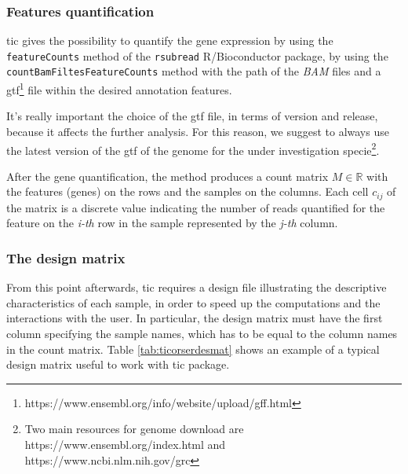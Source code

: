 \subsubsection{Features quantification}
\Gls{tic} gives the possibility to quantify the gene expression by using the \lstinline!featureCounts! method of the \lstinline!rsubread! R/Bioconductor package, by using the \lstinline!countBamFiltesFeatureCounts! method with the path of the \textit{BAM} files and a \gls{gtf}\footnote{https://www.ensembl.org/info/website/upload/gff.html} file within the desired annotation features.

It's really important the choice of the \gls{gtf} file, in terms of version and release, because it affects the further analysis. For this reason, we suggest to always use the latest version of the \gls{gtf} of the genome for the under investigation specie\footnote{Two main resources for genome download are https://www.ensembl.org/index.html and https://www.ncbi.nlm.nih.gov/grc}. 

After the gene quantification, the method produces a count matrix $M \in \mathbb{R}$ with the features (genes) on the rows and the samples on the columns. 
Each cell $c_{ij}$ of the matrix is a discrete value indicating the number of reads quantified for the feature on the \textit{i-th} row in the sample represented by the \textit{j-th} column. 

\subsubsection{The design matrix}
From this point afterwards, \gls{tic} requires a design file illustrating the descriptive characteristics of each sample, in order to speed up the computations and the interactions with the user.
In particular, the design matrix must have the first column specifying the sample names, which has to be equal to the column names in the count matrix.
Table \ref{tab:ticorserdesmat} shows an example of a typical design matrix useful to work with \gls{tic} package.

